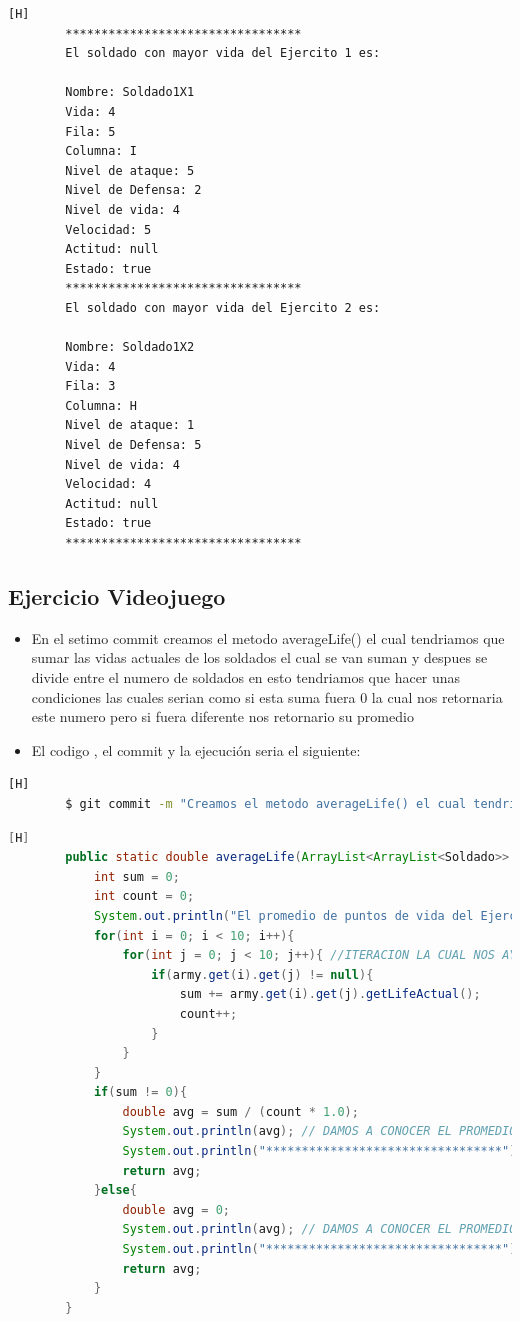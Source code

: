 \documentclass{article}
\begin{document}
	\begin{lstlisting}[language=bash,caption={Ejecucion:}][H]
		*********************************
		El soldado con mayor vida del Ejercito 1 es: 

		Nombre: Soldado1X1
		Vida: 4
		Fila: 5
		Columna: I
		Nivel de ataque: 5
		Nivel de Defensa: 2
		Nivel de vida: 4
		Velocidad: 5
		Actitud: null
		Estado: true
		*********************************
		El soldado con mayor vida del Ejercito 2 es: 

		Nombre: Soldado1X2
		Vida: 4
		Fila: 3
		Columna: H
		Nivel de ataque: 1
		Nivel de Defensa: 5
		Nivel de vida: 4
		Velocidad: 4
		Actitud: null
		Estado: true
		*********************************

	\end{lstlisting}
	\subsection{Ejercicio Videojuego}
	\begin{itemize}	
		\item En el setimo commit creamos el metodo averageLife() el cual tendriamos que sumar las vidas actuales de los soldados el cual se van suman y despues se divide entre el numero de soldados en esto tendriamos que hacer unas condiciones las cuales serian como si esta suma fuera 0 la cual nos retornaria este numero pero si fuera diferente nos retornario su promedio
		\item El codigo , el commit y la ejecución seria el siguiente:
	\end{itemize}	
	\begin{lstlisting}[language=bash,caption={Commit}][H]
		$ git commit -m "Creamos el metodo averageLife() el cual tendriamos que sumar las vidas actuales de los soldados el cual se van suman y despues se divide entre el numero de soldados en esto tendriamos que hacer unas condiciones las cuales serian como si esta suma fuera 0 la cual nos retornaria este numero pero si fuera diferente nos retornario su promedio"
	\end{lstlisting}	
	\begin{lstlisting}[language=java,caption={Las lineas de codigos del metodo creado:}][H]
		public static double averageLife(ArrayList<ArrayList<Soldado>> army , int num){
			int sum = 0;
			int count = 0;
			System.out.println("El promedio de puntos de vida del Ejercito " + num + " es: ");
			for(int i = 0; i < 10; i++){
				for(int j = 0; j < 10; j++){ //ITERACION LA CUAL NOS AYUDA A PASAR POR TODOS LOS SOLDADOS DE CADA EJERCITO
					if(army.get(i).get(j) != null){ 
						sum += army.get(i).get(j).getLifeActual();
						count++;
					}
				}
			}
			if(sum != 0){
				double avg = sum / (count * 1.0);
				System.out.println(avg); // DAMOS A CONOCER EL PROMEDIO DE VIDA DE CADA EJERCITO 
				System.out.println("*********************************");
				return avg;
			}else{
				double avg = 0;
				System.out.println(avg); // DAMOS A CONOCER EL PROMEDIO DE VIDA DE CADA EJERCITO 
				System.out.println("*********************************");
				return avg;
			}
		}

	\end{lstlisting}
\end{document}
